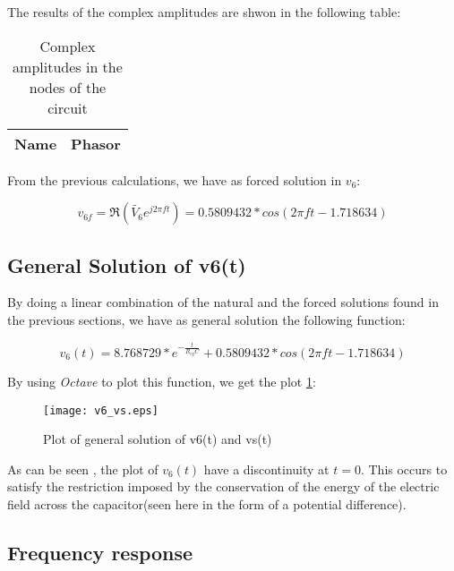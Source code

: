 \hfill


The results of the complex amplitudes are shwon in the following table:

\begin{table}[b]
  \centering
  \begin{tabular}{|l|c|}
    \hline
    {\bf Name} & {\bf Phasor} \\ \hline
    
  \end{tabular}
  \caption{Complex amplitudes in the nodes of the circuit}
  \label{tab:op_tabNodal}
\end{table}


From the previous calculations, we have as forced solution in $v_6$:

\begin{equation}
  v_{6f} = \Re (\tilde{V_6} e^{j 2\pi f t}) = 0.5809432*cos(2 \pi f t - 1.718634)
  \label{forcedSolution}
\end{equation}


\subsection{General Solution of v6(t)}

By doing a linear combination of the natural and the forced solutions found in the previous sections, we have as general solution the following function:

\begin{equation}
  v_6(t) = 8.768729*e^{-\frac{t}{R_{eq}C}} + 0.5809432*cos(2 \pi f t - 1.718634)
  \label{finalSolution}
\end{equation}

By using \textit{Octave} to plot this function, we get the plot \ref{fig:generalFinal}:

\begin{figure}[h] \centering
  \texttt{[image: v6\_vs.eps]}
  \caption{Plot of general solution of v6(t) and vs(t) }
  \label{fig:generalFinal}
\end{figure}


As can be seen , the plot of $v_6(t)$ have a discontinuity at $t = 0$.
This occurs to satisfy the restriction imposed by the conservation of the energy  of the electric field across the capacitor(seen here in the form of a potential difference).


\subsection{Frequency response}

